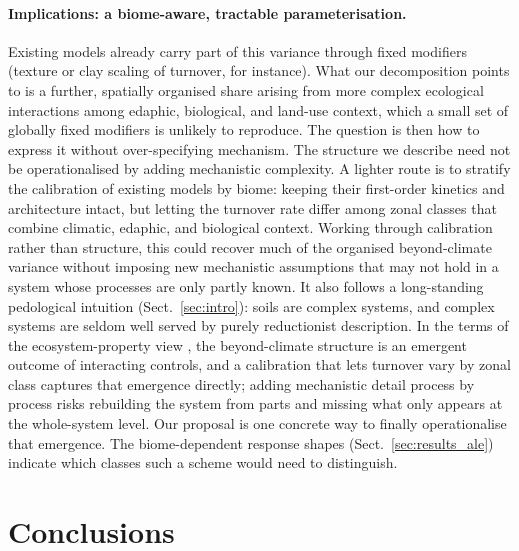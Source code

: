 \documentclass[12pt, a4paper]{article}
\begin{document}
\paragraph{Implications: a biome-aware, tractable parameterisation.}
Existing models already carry part of this variance through fixed modifiers
(texture or clay scaling of turnover, for instance). What our decomposition points
to is a further, spatially organised share arising from more complex ecological
interactions among edaphic, biological, and land-use context, which a small set of
globally fixed modifiers is unlikely to reproduce. The question is then how to
express it without over-specifying mechanism. The structure we describe need not be
operationalised by adding mechanistic complexity. A lighter route is to stratify the calibration of existing models by
biome: keeping their first-order kinetics and architecture intact, but letting the
turnover rate differ among zonal classes that combine climatic, edaphic, and
biological context. Working through calibration rather than structure, this could
recover much of the organised beyond-climate variance without imposing new
mechanistic assumptions that may not hold in a system whose processes are only
partly known. It also follows a long-standing pedological intuition
(Sect.~\ref{sec:intro}): soils are complex systems, and complex systems are seldom
well served by purely reductionist description. In the terms of the ecosystem-property
view \citep{Schmidt2011}, the beyond-climate structure is an emergent outcome of
interacting controls, and a calibration that lets turnover vary by zonal class
captures that emergence directly; adding mechanistic detail process by process risks
rebuilding the system from parts and missing what only appears at the whole-system
level. Our proposal is one concrete way to finally operationalise that emergence.
The biome-dependent response shapes
(Sect.~\ref{sec:results_ale}) indicate which classes such a scheme would need to
distinguish.

\section{Conclusions}
\end{document}
